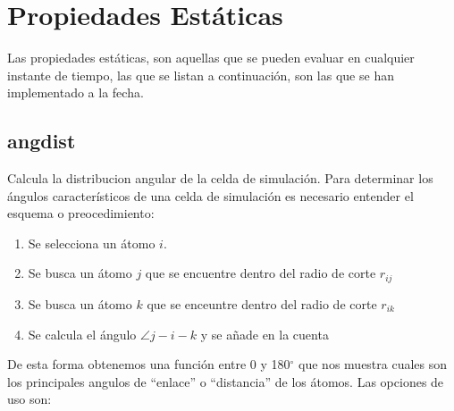 % 
% 

\section{Propiedades Est\'aticas}
Las propiedades est\'aticas, son aquellas que se pueden evaluar en cualquier instante de tiempo, las que se listan a continuaci\'on, son las que se han implementado a la fecha.
\subsection{angdist}
Calcula la distribucion angular de la celda de simulaci\'on. Para determinar los \'angulos caracter\'isticos de una celda de simulaci\'on es necesario entender el esquema o preocedimiento:
\begin{enumerate}
 \item Se selecciona un \'atomo $i$.
 \item Se busca un \'atomo $j$ que se encuentre dentro del radio de corte $r_{ij}$
 \item Se busca un \'atomo $k$ que se enceuntre dentro del radio de corte $r_{ik}$
 \item Se calcula el \'angulo  $\angle j-i-k$ y se a\~nade en la cuenta
\end{enumerate}

De esta forma obtenemos una funci\'on entre 0 y 180$^\circ$ que nos muestra cuales son los principales angulos de ``enlace'' o ``distancia'' de los \'atomos. Las opciones de uso son:


